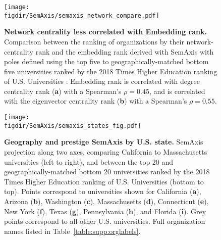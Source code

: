 \documentclass[12pt]{article} %
\def\figdir{../Figs}
\begin{document}
%
%
\begin{figure}[hp!]
	\centering
	\texttt{[image: \\figdir/SemAxis/semaxis\_network\_compare.pdf]}
	\caption{
		\textbf{Network centrality less correlated with Embedding rank.}
		Comparison between the ranking of organizations by their network-centrality rank and the embedding rank derived with SemAxis with poles defined using the top five to geographically-matched bottom five universities ranked by the 2018 Times Higher Education ranking of U.S. Universities .
		Embedding rank is correlated with degree centrality rank (\textbf{a}) with a Spearman's $\rho = 0.45$, and is correlated with the eigenvector centrality rank (\textbf{b}) with a Spearman's $\rho = 0.55$.
	}
	\label{fig:supp:centrality_semaxis_compare}
\end{figure}


%
%
\begin{figure}[hp!]
	\centering
	\texttt{[image: \\figdir/SemAxis/semaxis\_states\_fig.pdf]}
	\caption{
		\textbf{Geography and prestige SemAxis by U.S. state.}
		SemAxis projection along two axes, comparing California to Massachusetts universities (left to right), and between the top 20 and geographically-matched bottom 20 universities ranked by the 2018 Times Higher Education ranking of U.S. Universities (bottom to top).
		Points correspond to universities shown for California (\textbf{a}), Arizona (\textbf{b}), Washington (\textbf{c}), Massachusetts (\textbf{d}), Connecticut (\textbf{e}), New York (\textbf{f}), Texas (\textbf{g}), Pennsylvania (\textbf{h}), and Florida (\textbf{i}).
		Grey points correspond to all other U.S. universities.
		Full organization names listed in Table~\ref{table:supp:orglabels}.
	}
	\label{fig:supp:semaxis_states}
\end{figure}


%
%
\end{document}
